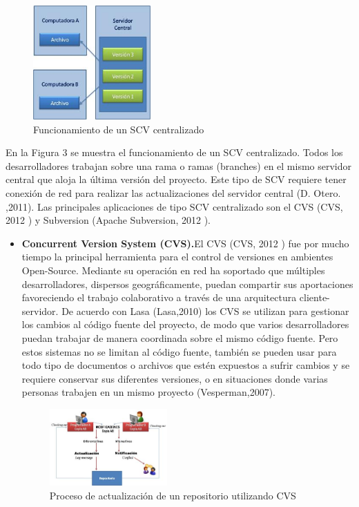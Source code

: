 \documentclass[a4paper,12pt]{article}
\begin{document}
{\begin{figure}[h]
	\centering
	\begin{minipage}[t]{5.5cm}
		\includegraphics[width=4.5cm]{grafico2.png}	 %
		\caption{ Funcionamiento de un SCV centralizado}
	\end{minipage}
	
\end{figure}
En la Figura 3 se muestra el funcionamiento de un SCV centralizado. Todos los desarrolladores trabajan sobre una rama o ramas (branches) en el mismo servidor central que aloja la última versión del proyecto. Este tipo de SCV requiere tener conexión de red para realizar las actualizaciones del servidor central (D. Otero. ,2011). Las principales aplicaciones de tipo SCV
centralizado son el CVS (CVS, 2012 ) y Subversion (Apache Subversion, 2012 ).

\begin{itemize}
	\item  \textbf{Concurrent Version System (CVS).}El CVS (CVS, 2012 ) fue por mucho tiempo la principal herramienta para el control de versiones en ambientes Open-Source. Mediante su operación en red ha soportado que múltiples desarrolladores, dispersos geográficamente, puedan compartir sus aportaciones favoreciendo el trabajo colaborativo a
	través de una arquitectura cliente-servidor. De acuerdo con Lasa (Lasa,2010) los CVS se utilizan para gestionar los cambios al código fuente del proyecto, de modo que varios desarrolladores puedan trabajar de manera coordinada sobre el mismo código fuente. Pero estos sistemas no se limitan al código fuente, también se pueden usar para todo tipo de
	documentos o archivos que estén expuestos a sufrir cambios y se requiere conservar sus diferentes versiones, o en situaciones donde varias personas trabajen en un mismo proyecto (Vesperman,2007).
	\begin{figure}[h]
		\centering
		\begin{minipage}[t]{5.5cm}
			\includegraphics[width=4.5cm]{grafico4.png}	 %
			\caption{ Proceso de actualización de un repositorio utilizando CVS}
		\end{minipage}
		

\end{figure}
\end{itemize}}
\end{document}
